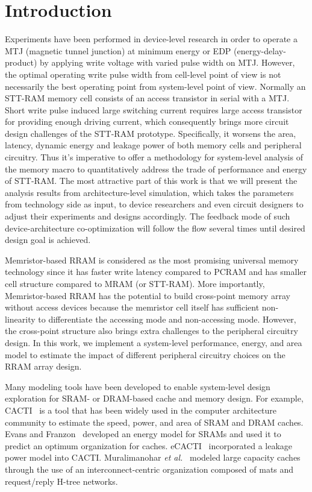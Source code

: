 \section{Introduction} \label{sec:intro}

Experiments have been performed in device-level research in order to operate a MTJ (magnetic tunnel junction) at minimum energy or EDP (energy-delay-product) by applying write voltage with varied pulse width on MTJ. However, the optimal operating write pulse width from cell-level point of view is not necessarily the best operating point from system-level point of view. Normally an STT-RAM memory cell consists of an access transistor in serial with a MTJ. Short write pulse induced large switching current requires large access transistor for providing enough driving current, which consequently brings more circuit design challenges of the STT-RAM prototype. Specifically, it worsens the area, latency, dynamic energy and leakage power of both memory cells and peripheral circuitry.  Thus it's imperative to offer a methodology for system-level analysis of the memory macro to quantitatively address the trade of performance and energy of STT-RAM. The most attractive part of this work is that we will present the analysis results from architecture-level simulation, which takes the parameters from technology side as input, to device researchers and even circuit designers to adjust their experiments and designs accordingly. The feedback mode of such device-architecture co-optimization will follow the flow several times until desired design goal is achieved.

Memristor-based RRAM is considered as the most promising universal memory technology since it has faster write latency compared to PCRAM and has smaller cell structure compared to MRAM (or STT-RAM).  More importantly, Memristor-based RRAM has the potential to build cross-point memory array without access devices because the memristor cell itself has sufficient non-linearity to differentiate the accessing mode and non-accessing mode.  However, the cross-point structure also brings extra challenges to the peripheral circuitry design.  In this work, we implement a system-level performance, energy, and area model to estimate the impact of different peripheral circuitry choices on the RRAM array design.

Many modeling tools have been developed to enable system-level design exploration for SRAM- or DRAM-based cache and memory design.  For example, CACTI~\cite{CACTI51} is a tool that has been widely used in the computer architecture community to estimate the speed, power, and area of SRAM and DRAM caches.  Evans and Franzon~\cite{CACTI:JSSC95:Evans} developed an energy model for SRAMs and used it to predict an optimum organization for caches.  eCACTI~\cite{eCACTI} incorporated a leakage power model into CACTI.  Muralimanohar \emph{et al.}~\cite{CACTI60} modeled large capacity caches through the use of an interconnect-centric organization composed of mats and request/reply H-tree networks.

